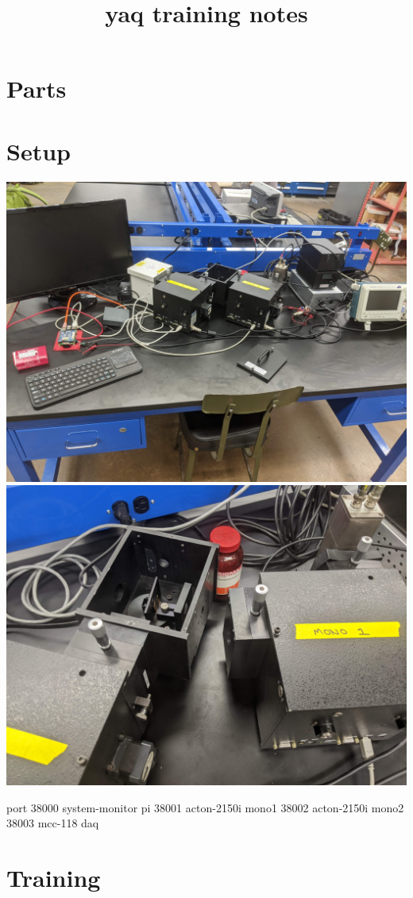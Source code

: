 \documentclass{article}
\title{yaq training notes}
\begin{document}
\maketitle

\section{Parts}

\section{Setup}

\includegraphics[width=\textwidth]{./setup.jpg}
\includegraphics[width=\textwidth]{./emission-mono-detail.jpg}

port
38000 system-monitor pi
38001 acton-2150i mono1
38002 acton-2150i mono2
38003 mcc-118 daq


\section{Training}
\end{document}
